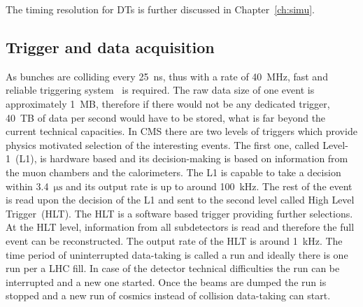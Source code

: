 \begin{description}
The timing resolution for DTs is further discussed in Chapter~\ref{ch:simu}.


\end{description}

\subsection{Trigger and data acquisition}

As bunches are colliding every 25~ns, thus with a rate of 40~MHz, fast and reliable triggering system~\cite{Khachatryan:2016bia} is required. The raw data size of one event is approximately 1~MB, therefore if there would not be any dedicated trigger, 40~TB of data per second would have to be stored, what is far beyond the current technical capacities. In CMS there are two levels of triggers which provide physics motivated selection of the interesting events. The first one, called Level-1~(L1), is hardware based and its decision-making is based on information from the muon chambers and the calorimeters. The L1 is capable to take a decision within 3.4~$\mathrm{\mu s}$ and its output rate is up to around 100~kHz. The rest of the event is read upon the decision of the L1 and sent to the second level called High Level Trigger~(HLT). The HLT is a software based trigger providing further selections. At the HLT level, information from all subdetectors is read and therefore the full event can be reconstructed. The output rate of the HLT is around 1~kHz. The time period of uninterrupted data-taking is called a run and ideally there is one run per a LHC fill. In case of the detector technical difficulties the run can be interrupted and a new one started. Once the beams are dumped the run is stopped and a new run of cosmics instead of collision data-taking can start.

